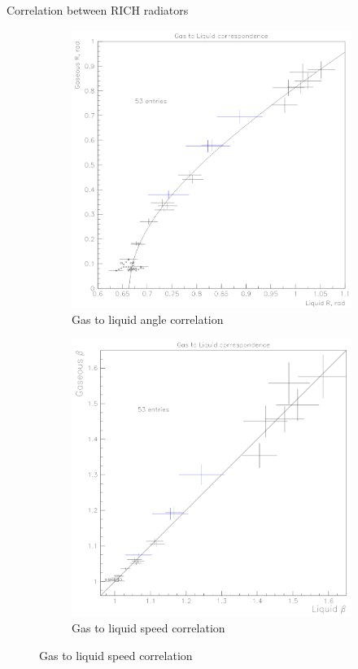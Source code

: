 \documentclass{beamer}
\begin{document}
\begin{frame}{Correlation between RICH radiators}
  \begin{figure}
    \centering
    \begin{subfigure}{0.5\textwidth}
      \includegraphics[width = 1\textwidth]{AngleCorrelation.png}
      \caption{Gas to liquid angle correlation}
    \end{subfigure}%
    \begin{subfigure}{0.5\textwidth}
      \includegraphics[width = 1\textwidth]{SpeedCorrelation.png}
      \caption{Gas to liquid speed correlation}
    \end{subfigure}
  \end{figure}
\end{frame}
\end{document}

